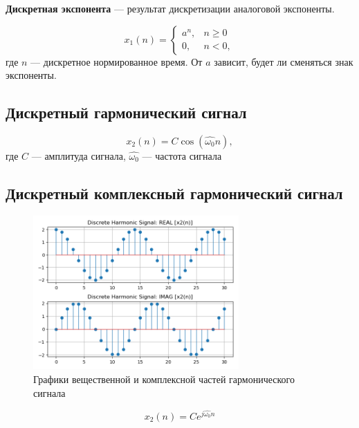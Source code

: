 \documentclass[a4paper, 14pt]{extarticle}
\begin{document}
\textbf{Дискретная экспонента} --- результат дискретизации аналоговой экспоненты.

\begin{equation}
    x_1(n) = \begin{cases}
        a^n, &n \ge 0 \\
        0, &n < 0,
    \end{cases}
\end{equation}
где $n$ --- дискретное нормированное время. От $a$ зависит, будет ли сменяться знак экспоненты.

\clearpage
\subsection{Дискретный гармонический сигнал}
\begin{equation}
    x_2(n) = C \cos (\hat{ \omega_0 } n),
\end{equation}
где $C$ --- амплитуда сигнала, $\hat{ \omega_0 }$ --- частота сигнала

\subsection{Дискретный комплексный гармонический сигнал}
\begin{figure}[h]
    \centering
    \includegraphics[width=0.7\textwidth]{img/signals/4.png}
    \caption{Графики вещественной и комплексной частей гармонического сигнала}%
\end{figure}

\begin{equation}
    x_2(n) = C e ^{j\hat{ \omega_0 } n}
\end{equation}

\clearpage
\end{document}
